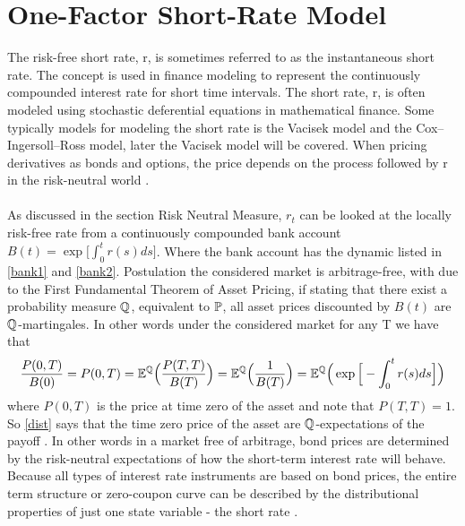 \section{One-Factor Short-Rate Model}
The risk-free short rate, r, is sometimes referred to as the instantaneous short rate. 
The concept is used in finance modeling to represent the continuously compounded interest rate for 
short time intervals. The short rate, r, is often modeled using stochastic deferential equations in 
mathematical finance. Some typically models for modeling the short rate is the Vacisek model and the Cox–Ingersoll–Ross model, 
later the Vacisek model will be covered. When pricing derivatives as bonds and options, the price depends on 
the process followed by r in the risk-neutral world \cite{Hull}.
\\\\
As discussed in the section Risk Neutral Measure, $r_t$ can be looked at the locally risk-free 
rate from a continuously compounded bank account $B(t)= \exp \Big[\int_{0}^{t} r(s) ds \Big]$. 
Where the bank account has the dynamic listed in \autoref{bank1} and \autoref{bank2}.
Postulation the considered market is arbitrage-free, with due to the First Fundamental Theorem of Asset Pricing, 
if stating that there exist a probability measure $\mathbb{Q}$, equivalent to $\mathbb{P}$, all asset prices discounted by $B(t)$
are $\mathbb{Q}$-martingales. In other words under the considered market for any T we have that 
\begin{align}
    \frac{P(0,T)}{B(0)} = P(0,T) = \mathbb{E}^{\mathbb{Q}} \Big( \frac{P(T,T)}{B(T)}\Big) = \mathbb{E}^{\mathbb{Q}} \Big( \frac{1}{B(T)}\Big) 
    = \mathbb{E}^{\mathbb{Q}} \Big( \exp \Big[ - \int_{0}^{t}r(s)ds \Big] \Big)
    \label{dist}
\end{align}
where $P(0,T)$ is the price at time zero of the asset and note that $P(T,T)=1$. So \autoref{dist} says that 
the time zero price of the asset are $\mathbb{Q}$-expectations  of the payoff \cite{Bermudan}.
In other words in a market free of arbitrage, bond prices are determined by the risk-neutral expectations 
of how the short-term interest rate will behave. Because all types of interest rate instruments are based
on bond prices, the entire term structure or zero-coupon curve can be described by the distributional properties
of just one state variable - the short rate \cite{Bermudan}.


